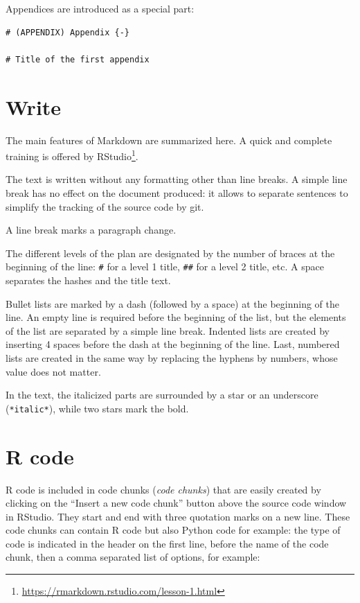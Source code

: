 \documentclass[
  12pt,
  american,
  a4paper,
  extrafontsizes,onecolumn,openright
  ]{memoir}
\begin{document}
Appendices are introduced as a special part:

\begin{verbatim}
# (APPENDIX) Appendix {-} 

# Title of the first appendix
\end{verbatim}

\section{Write}\label{write}

The main features of Markdown are summarized here.
A quick and complete training is offered by RStudio\footnote{\url{https://rmarkdown.rstudio.com/lesson-1.html}}.

The text is written without any formatting other than line breaks.
A simple line break has no effect on the document produced: it allows to separate sentences to simplify the tracking of the source code by git.

A line break marks a paragraph change.

The different levels of the plan are designated by the number of braces at the beginning of the line: \texttt{\#} for a level 1 title, \texttt{\#\#} for a level 2 title, etc.
A space separates the hashes and the title text.

Bullet lists are marked by a dash (followed by a space) at the beginning of the line.
An empty line is required before the beginning of the list, but the elements of the list are separated by a simple line break.
Indented lists are created by inserting 4 spaces before the dash at the beginning of the line.
Last, numbered lists are created in the same way by replacing the hyphens by numbers, whose value does not matter.

In the text, the italicized parts are surrounded by a star or an underscore (\texttt{*italic*}), while two stars mark the bold.

\section{R code}\label{r-code}

R code is included in code chunks (\emph{code chunks}) that are easily created by clicking on the \enquote{Insert a new code chunk} button above the source code window in RStudio.
They start and end with three quotation marks on a new line.
These code chunks can contain R code but also Python code for example: the type of code is indicated in the header on the first line, before the name of the code chunk, then a comma separated list of options, for example:
\end{document}
